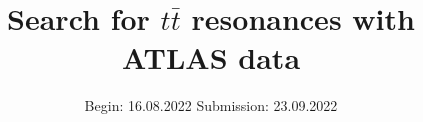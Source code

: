 


\title{Search for $t\bar{t}$ resonances with ATLAS data}
\date{%
  Begin: 16.08.2022
  \hspace{3em}
  Submission:  23.09.2022
}



\maketitle
\thispagestyle{empty}
\tableofcontents
\newpage






\printbibliography[title={Literature}]{}


